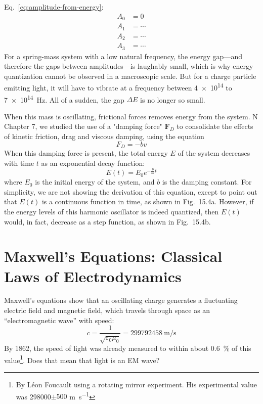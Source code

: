 Eq.~\ref{eq:amplitude-from-energy}:
\begin{align*}
  A_0 &= 0\\
  A_1 &= \cdots\\
  A_2 &= \cdots\\
  A_3 &= \cdots
\end{align*}
For a spring-mass system with a low natural frequency, the energy gap---and
therefore the gaps between amplitudes---is laughably small, which is why energy
quantization cannot be observed in a macroscopic scale. But for a charge
particle emitting light, it will have to vibrate at a frequency between
\num{4e14} to \SI{7e14}{\hertz}. All of a sudden, the gap $\Delta E$ is no longer so
small.

When this mass is oscillating, frictional forces removes energy from the
system. N Chapter 7, we studied the use of a "damping force" $\bm F_D$ to
consolidate the effects of kinetic friction, drag and viscous damping, using
the equation
\begin{equation*}
  F_D= -bv
\end{equation*}
When this damping force is present, the total energy $E$ of the system decreases
with time $t$ as an exponential decay function:
\begin{equation}
  E(t)=E_0e^{-\frac bmt} %
\end{equation}
where $E_0$ is the initial energy of the system, and $b$ is the damping
constant. For simplicity, we are not showing the derivation of this equation,
except to point out that $E(t)$ is a continuous function in time, as shown in
Fig.\ 15.4a. However, if the energy levels of this harmonic oscillator is
indeed quantized, then $E(t)$ would, in fact, decrease as a step function, as
shown in Fig.\ 15.4b.


\section{Maxwell's Equations: Classical Laws of Electrodynamics}
Maxwell's equations show that an oscillating charge generates a fluctuating
electric field and magnetic field, which travels through space as an
``electromagnetic wave'' with speed:
\begin{equation*}
  c=\frac1{\sqrt{\varepsilon_0\mu_0}}=\SI{299792458}{\meter\per\second}
\end{equation*}
By 1862, the speed of light was already measured to within about
\SI{.6}{\percent} of this value\footnote{By L\'{e}on Foucault using a
rotating mirror experiment. His experimental value was
\num{298000}$\pm 500$ \si{\metre\per\second}}. Does that mean that light is
an EM wave?




